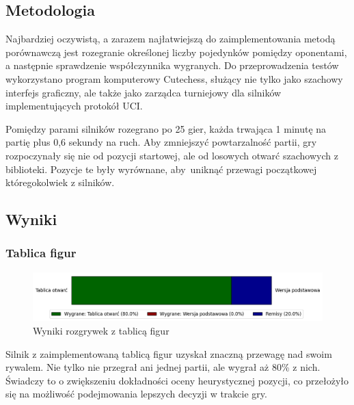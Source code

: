 
\subsection{Metodologia}
Najbardziej oczywistą, a zarazem najłatwiejszą do zaimplementowania metodą porównawczą jest rozegranie określonej liczby pojedynków pomiędzy oponentami, a następnie sprawdzenie współczynnika wygranych.
Do przeprowadzenia testów wykorzystano program komputerowy Cutechess, służący nie tylko jako szachowy interfejs graficzny, ale także jako zarządca turniejowy dla silników implementujących protokół UCI.

Pomiędzy parami silników rozegrano po 25 gier, każda trwająca 1 minutę na partię plus 0,6 sekundy na ruch.
Aby zmniejszyć powtarzalność partii, gry rozpoczynały się nie od pozycji startowej, ale od losowych otwarć szachowych z biblioteki. \cite{lichess-book}
Pozycje te były wyrównane, aby~uniknąć przewagi początkowej któregokolwiek z silników.

\newpage
\subsection{Wyniki}


\subsubsection{Tablica figur}
\begin{figure}[ht]
    \centering
    \includegraphics[width=1\linewidth]{rozdzialy/rozdzial03/1_porownanie-wersji-silnika/rysunki/wyniki-tablica}
    \caption{Wyniki rozgrywek z tablicą figur}
    \label{fig:wyniki-tablica}
\end{figure}
Silnik z zaimplementowaną tablicą figur uzyskał znaczną przewagę nad swoim rywalem.
Nie tylko nie przegrał ani jednej partii, ale wygrał aż 80\% z nich.
Świadczy to o zwiększeniu dokładności oceny heurystycznej pozycji, co przełożyło się na możliwość podejmowania lepszych decyzji w trakcie gry.


